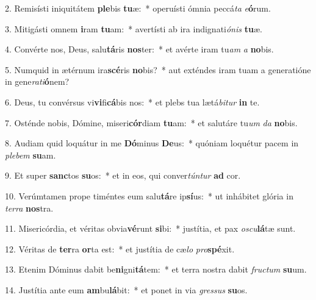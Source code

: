 2. Remisísti iniquitátem \textbf{ple}bis \textbf{tu}æ:~*  operuísti ómnia peccá\textit{ta} \textit{e}\textbf{ó}rum.\

3. Mitigásti omnem \textbf{i}ram \textbf{tu}am:~*  avertísti ab ira indignati\textit{ó}\textit{nis} \textbf{tu}æ.\

4. Convérte nos, Deus, salu\textbf{tá}ris \textbf{nos}ter:~*  et avérte iram tu\textit{am} \textit{a} \textbf{no}bis.\

5. Numquid in ætérnum ira\textbf{scé}ris \textbf{no}bis?~*  aut exténdes iram tuam a generatióne in gene\textit{ra}\textit{ti}\textbf{ó}nem?\

6. Deus, tu convérsus vi\textbf{vi}fi\textbf{cá}bis nos:~*  et plebs tua lætá\textit{bi}\textit{tur} \textbf{in} te.\

7. Osténde nobis, Dómine, miseri\textbf{cór}diam \textbf{tu}am:~*  et salutáre tu\textit{um} \textit{da} \textbf{no}bis.\

8. Audiam quid loquátur in me \textbf{Dó}minus \textbf{De}us:~*  quóniam loquétur pacem in \textit{ple}\textit{bem} \textbf{su}am.\

9. Et super \textbf{sanc}tos \textbf{su}os:~*  et in eos, qui conver\textit{tún}\textit{tur} \textbf{ad} cor.\

10. Verúmtamen prope timéntes eum salu\textbf{tá}re ip\textbf{sí}us:~*  ut inhábitet glória in \textit{ter}\textit{ra} \textbf{nos}tra.\

11. Misericórdia, et véritas obvia\textbf{vé}runt \textbf{si}bi:~*  justítia, et pax \textit{os}\textit{cu}\textbf{lá}tæ sunt.\

12. Véritas de \textbf{ter}ra \textbf{or}ta est:~*  et justítia de cæ\textit{lo} \textit{pro}\textbf{spé}xit.\

13. Etenim Dóminus dabit be\textbf{ni}gni\textbf{tá}tem:~*  et terra nostra dabit \textit{fruc}\textit{tum} \textbf{su}um.\

14. Justítia ante eum \textbf{am}bu\textbf{lá}bit:~*  et ponet in via \textit{gres}\textit{sus} \textbf{su}os.\

